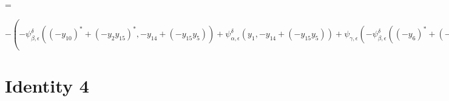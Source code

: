 \documentclass[a4paper,landscape]{article}
\begin{document}
\addvspace{0.5cm}
=

\addvspace{0.5cm}
$ -(-\psi_{\beta,\epsilon}^\delta((-y_{10})^*+(-y_2y_{15})^*,-y_{14}+(-y_{15}y_5))+\psi_{\alpha,\epsilon}^\delta(y_1,-y_{14}+(-y_{15}y_5))+\psi_{\gamma,\epsilon}(-\psi_{\beta,\epsilon}^\delta((-y_6)^*+(-y_4y_{10})^*,y_{15})+\psi_{\alpha,\epsilon}^\delta(y_3,y_{15})+\psi_{\gamma,\epsilon}(-\psi_{\beta,\epsilon}^\delta((y_7)^*,y_{10})+\psi_{\alpha,\epsilon}^\delta(y_5,y_{10})+\psi_{\gamma,\epsilon}(-y_8,y_{10})+(-(y_9)^*),y_{15})+(-(y_{12})^*),-y_{14}+(-y_{15}y_5))+(-(-((-\psi_{\alpha,\delta}^\beta(y_{15},-(y_7)^*+\psi_{\alpha,\epsilon}^\beta(y_5,y_{10})+\psi_{\alpha,\gamma}(y_5,\psi_{\alpha,\delta}^\gamma(y_5,\psi_{\alpha,\epsilon}^\delta(y_5,y_{10})+\psi_{\gamma,\epsilon}(-y_8,y_{10})+(-(y_9)^*))+\psi_{\alpha,\epsilon}^\gamma(y_5,y_{10})+(-y_8))+\psi_{\alpha,\delta}^\beta(y_5,\psi_{\alpha,\epsilon}^\delta(y_5,y_{10})+\psi_{\gamma,\epsilon}(-y_8,y_{10})+(-(y_9)^*))))^*+(-\psi_{\alpha,\epsilon}^\beta(y_{15},y_4))^*+(-\psi_{\alpha,\gamma}(y_{15},-y_{11}+(-y_5y_{12})))^*+(-y_{13})^*))^*)) $

\section*{Identity 4}
\end{document}
